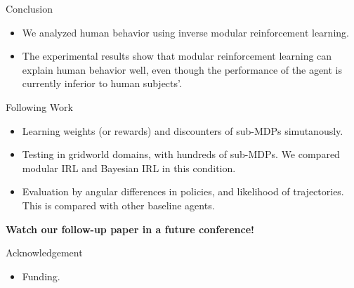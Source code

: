 \documentclass[final]{beamer}
\begin{document}
\begin{frame}{}
\begin{textblock}{37}
\begin{block}{Conclusion}
\begin{itemize}
\item
We analyzed human behavior using inverse modular reinforcement learning.
\item
The experimental results show that modular reinforcement learning can explain
human behavior well, even though the performance of the agent is currently
inferior to human subjects'.
\end{itemize}
\end{block}

\begin{block}{Following Work}
\begin{itemize}
\item
Learning weights (or rewards) and discounters of sub-MDPs simutanously.
\item
Testing in gridworld domains, with hundreds of sub-MDPs. We compared modular IRL
and Bayesian IRL in this condition.
\item
Evaluation by angular differences in policies, and likelihood of trajectories.
This is compared with other baseline agents.
\end{itemize}

{\bf Watch our follow-up paper in a future conference!}
\end{block}

\begin{block}{Acknowledgement}
\begin{itemize}
\item Funding.
\end{itemize}
\end{block}

\end{textblock}

\end{frame}
\end{document}
